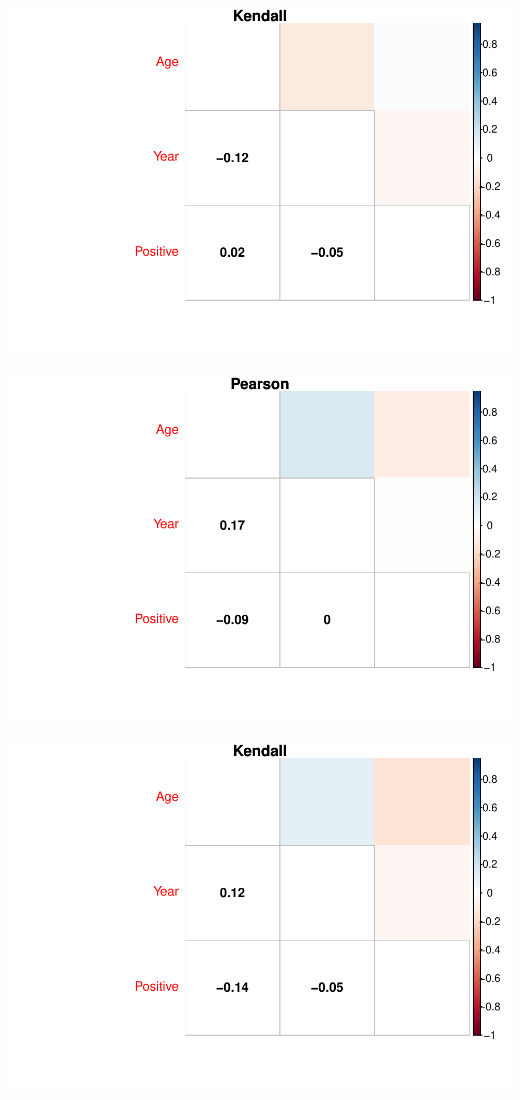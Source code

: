\documentclass[
]{article}
\begin{document}
\begin{center}\includegraphics{Clasificacion_files/figure-latex/unnamed-chunk-27-2} \end{center}

\begin{center}\includegraphics{Clasificacion_files/figure-latex/unnamed-chunk-28-1} \end{center}

\begin{center}\includegraphics{Clasificacion_files/figure-latex/unnamed-chunk-28-2} \end{center}
\end{document}
